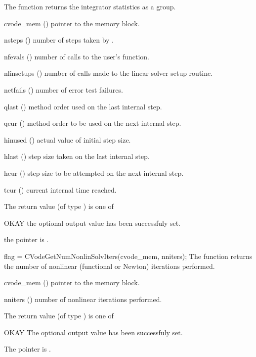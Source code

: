 {
  The function  returns the {\cvodes} integrator statistics
  as a group.
}
{
  \begin{args}
  \item[cvode\_mem] ()
    pointer to the {\cvodes} memory block.
  \item[nsteps] ()
    number of steps taken by {\cvodes}.
  \item[nfevals] ()
    number of calls to the user's  function.
  \item[nlinsetups] ()
    number of calls made to the linear solver setup routine.
  \item[netfails] ()
    number of error test failures.
  \item[qlast] ()
    method order used on the last internal step.
  \item[qcur] ()
    method order to be used on the next internal step.
  \item[hinused] ()
    actual value of initial step size.
  \item[hlast] ()
    step size taken on the last internal step.
  \item[hcur] ()
    step size to be attempted on the next internal step.
  \item[tcur] ()
    current internal time reached.
  \end{args}
}
{
  The return value  (of type ) is one of
  \begin{args}
  \item[OKAY] 
    the optional output value has been successfuly set.
  \item[\Id{CVG\_NO\_MEM}]
    the  pointer is .
  \end{args}
}
{}
{
  flag = CVodeGetNumNonlinSolvIters(cvode\_mem, nniters);
}
{
  The function  returns the
  number of nonlinear (functional or Newton) iterations performed. 
}
{
  \begin{args}
  \item[cvode\_mem] ()
    pointer to the {\cvodes} memory block.
  \item[nniters] ()
    number of nonlinear iterations performed.
  \end{args}
}
{
  The return value  (of type ) is one of
  \begin{args}
  \item[OKAY] 
    The optional output value has been successfuly set.
  \item[\Id{CVG\_NO\_MEM}]
    The  pointer is .
  \end{args}
}
